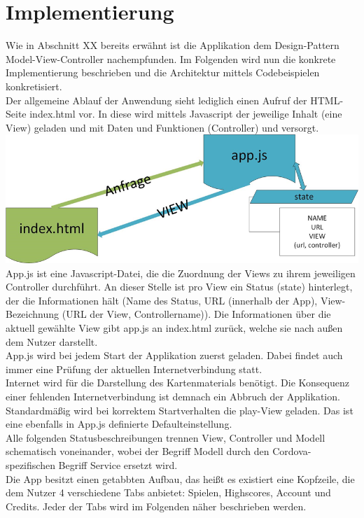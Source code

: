 \newpage
\section{Implementierung}

Wie in Abschnitt XX bereits erwähnt ist die Applikation dem Design-Pattern Model-View-Controller nachempfunden. Im Folgenden wird nun die konkrete Implementierung beschrieben und die Architektur mittels Codebeispielen konkretisiert.
\\
Der allgemeine Ablauf der Anwendung sieht lediglich einen Aufruf der HTML-Seite index.html vor. In diese wird mittels Javascript der jeweilige Inhalt (eine View) geladen und mit Daten und Funktionen (Controller) und versorgt.
\\
\includegraphics[width=1\textwidth]{ref/images/index.png} \\ 
App.js ist eine Javascript-Datei, die die Zuordnung der Views zu ihrem jeweiligen Controller durchführt. An dieser Stelle ist pro View ein Status (state) hinterlegt, der die Informationen hält (Name des Status, URL (innerhalb der App), View-Bezeichnung (URL der View, Controllername)). Die Informationen über die aktuell gewählte View gibt app.js an index.html zurück, welche sie nach außen dem Nutzer darstellt.
\\
App.js wird bei jedem Start der Applikation zuerst geladen. Dabei findet auch immer eine Prüfung der aktuellen Internetverbindung statt.
\\
Internet wird für die Darstellung des Kartenmaterials benötigt. Die Konsequenz einer fehlenden Internetverbindung ist demnach ein Abbruch der Applikation.
\\
Standardmäßig wird bei korrektem Startverhalten die play-View geladen. Das ist eine ebenfalls in App.js definierte Defaulteinstellung.
\\
Alle folgenden Statusbeschreibungen trennen View, Controller und Modell schematisch voneinander, wobei der Begriff Modell durch den Cordova-spezifischen Begriff Service ersetzt wird.
\\
Die App besitzt einen getabbten Aufbau, das heißt es existiert eine Kopfzeile, die dem Nutzer 4 verschiedene Tabs anbietet: Spielen, Highscores, Account und Credits. Jeder der Tabs wird im Folgenden näher beschrieben werden.
